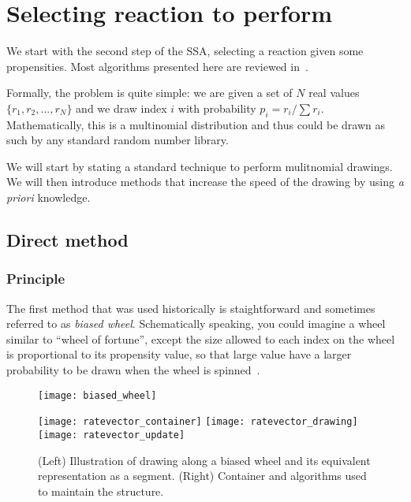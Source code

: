 \section {Selecting reaction to perform}
\label{sec:reaction_selection}

We start with the second step of the SSA, selecting a reaction given some propensities. Most algorithms presented here are reviewed in~\citet{gillespie_perspective:_2013}.

Formally, the problem is quite simple: we are given a set of $N$ real values $\{ r_1, r_2, ..., r_N \}$ and we draw index $i$ with probability $p_i = r_i / \sum r_i$. Mathematically, this is a multinomial distribution and thus could be drawn as such by any standard random number library.

We will start by stating a standard technique to perform mulitnomial drawings. We will then introduce methods that increase the speed of the drawing by using \textit {a priori} knowledge.

\subsection {Direct method}

\subsubsection {Principle}

The first method that was used historically is staightforward and sometimes referred to as \textit {biased wheel}. Schematically speaking, you could imagine a wheel similar to ``wheel of fortune'', except the size allowed to each index on the wheel is proportional to its propensity value, so that large value have a larger probability to be drawn when the wheel is spinned~.

\begin{figure}[!h]
  \centering
  \begin{minipage}{\textwidth}
    \begin{minipage}{0.5\textwidth}
      \texttt{[image: biased\_wheel]}
    \end{minipage}
    \begin{minipage}{0.5\textwidth}
      \texttt{[image: ratevector\_container]}
      \texttt{[image: ratevector\_drawing]}
      \texttt{[image: ratevector\_update]}
    \end{minipage}
  \end{minipage}
  \caption{(Left) Illustration of drawing along a biased wheel and its equivalent representation as a segment. (Right) Container and algorithms used to maintain the structure.}
  \label{fig:biased_wheel}
\end {figure}

